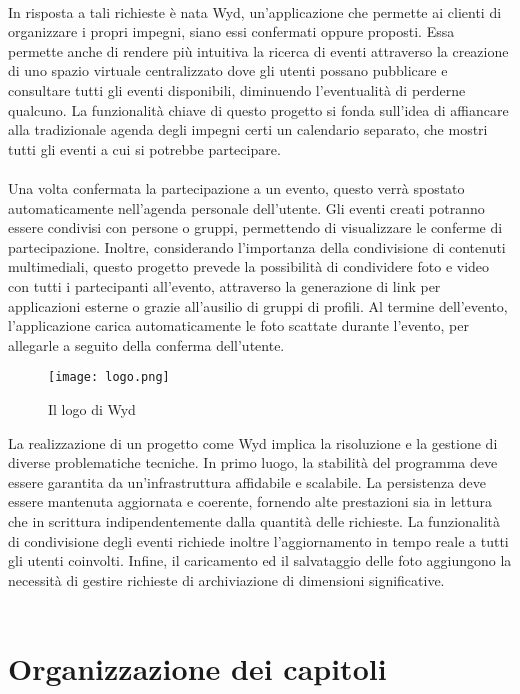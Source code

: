 \\
In risposta a tali richieste è nata Wyd, un'applicazione che permette ai clienti di organizzare i propri impegni, 
siano essi confermati oppure proposti. 
Essa permette anche di rendere più intuitiva la ricerca di eventi attraverso la creazione di uno spazio virtuale centralizzato 
dove gli utenti possano pubblicare e consultare tutti gli eventi disponibili,
diminuendo l’eventualità di perderne qualcuno.
La funzionalità chiave di questo progetto si fonda sull'idea di affiancare alla tradizionale agenda degli impegni certi un calendario separato, 
che mostri tutti gli eventi a cui si potrebbe partecipare. \\
\\
Una volta confermata la partecipazione a un evento, 
questo verrà spostato automaticamente nell'agenda personale dell'utente.
Gli eventi creati potranno essere condivisi con persone o gruppi, 
permettendo di visualizzare le conferme di partecipazione. 
Inoltre, considerando l'importanza della condivisione di contenuti multimediali, 
questo progetto prevede la possibilità di condividere foto e video con tutti i partecipanti all'evento, 
attraverso la generazione di link per applicazioni esterne o grazie all'ausilio di gruppi di profili. 
Al termine dell’evento, l'applicazione carica automaticamente le foto scattate durante l'evento,
per allegarle a seguito della conferma dell'utente.


\begin{figure}[h!]
    \centering
    \texttt{[image: logo.png]}
    \caption{Il logo di Wyd}
\end{figure}	

\clearpage
La realizzazione di un progetto come Wyd implica la risoluzione e 
la gestione di diverse problematiche tecniche. 
In primo luogo, la stabilità del programma deve essere garantita 
da un'infrastruttura affidabile e scalabile. 
La persistenza deve essere mantenuta aggiornata e coerente, 
fornendo alte prestazioni sia in lettura che in scrittura indipendentemente dalla quantità delle richieste.
La funzionalità di condivisione degli eventi richiede inoltre l'aggiornamento in tempo reale a tutti gli utenti coinvolti.
Infine, il caricamento ed il salvataggio delle foto aggiungono la necessità di gestire richieste di archiviazione di dimensioni significative.\\
\\
\section*{Organizzazione dei capitoli}

